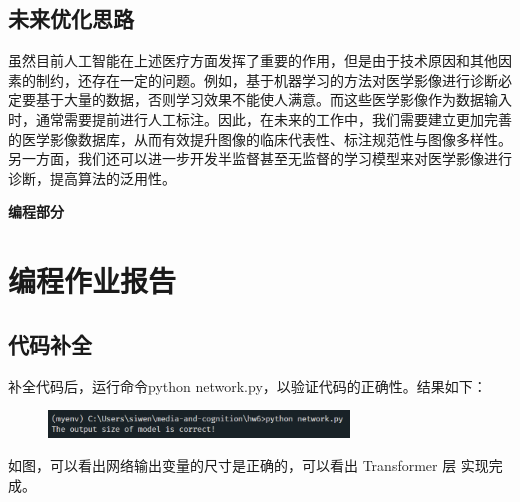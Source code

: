\documentclass[a4paper]{article}
\begin{document}
\subsection{未来优化思路}
\hspace{2em}虽然目前人工智能在上述医疗方面发挥了重要的作用，但是由于技术原因和其他因素的制约，还存在一定的问题。例如，基于机器学习的方法对医学影像进行诊断必定要基于大量的数据，否则学习效果不能使人满意。而这些医学影像作为数据输入时，通常需要提前进行人工标注。因此，在未来的工作中，我们需要建立更加完善的医学影像数据库，从而有效提升图像的临床代表性、标注规范性与图像多样性。另一方面，我们还可以进一步开发半监督甚至无监督的学习模型来对医学影像进行诊断，提高算法的泛用性。
\vspace{3mm}
\centerline{\textbf{\Large{编程部分}}}
\vspace{3mm}
\section{编程作业报告}
\subsection{代码补全}
\hspace{2em}补全代码后，运行命令python network.py，以验证代码的正确性。结果如下：\\
\begin{figure}[H]
    \centering
    \includegraphics[width=8cm]{1.png}
\end{figure}
\hspace{2em}如图，可以看出网络输出变量的尺寸是正确的，可以看出 Transformer 层
实现完成。
\end{document}
